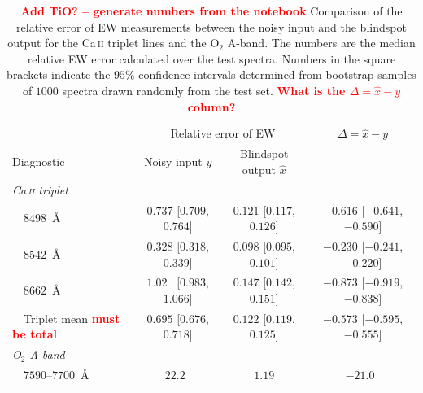 \documentclass[twocolumn]{aastex7}
\newcommand{\ld}[1]{\textcolor{red}{\textbf{#1}}}
\begin{document}
\begin{table}
\centering
    \begin{tabular}{lccc}
        \hline
          & \multicolumn{2}{c}{Relative error of EW} & $\Delta=\hat{x}-y$ \\
        Diagnostic & Noisy input $y$ & Blindspot output $\hat{x}$ \\
        \hline
        \multicolumn{4}{l}{\emph{Ca\,\textsc{ii} triplet}} \\
        $\quad 8498$~\AA   & $0.737$ [$0.709$, $0.764$] & $0.121$ [$0.117$, $0.126$] & $-0.616$ [$-0.641$, $-0.590$] \\
        $\quad 8542$~\AA   & $0.328$ [$0.318$, $0.339$] & $0.098$ [$0.095$, $0.101$] & $-0.230$ [$-0.241$, $-0.220$] \\
        $\quad 8662$~\AA   & $1.02\phantom{0}$ [$0.983$, $1.066$] & $0.147$ [$0.142$, $0.151$] & $-0.873$ [$-0.919$, $-0.838$] \\
        $\quad$Triplet mean \ld{must be total} & $0.695$ [$0.676$, $0.718$] & $0.122$ [$0.119$, $0.125$] & $-0.573$ [$-0.595$, $-0.555$] \\
        \hline
        \multicolumn{3}{l}{\emph{\mbox{O$_2$} A-band}} \\
        $\quad 7590$--$7700$~\AA{} & $22.2\phantom{0}$ & $1.19$ & $-21.0\phantom{0}$ \\
        \hline
\end{tabular}
\caption{
    \ld{Add TiO? -- generate numbers from the notebook}
    Comparison of the relative error of EW measurements between the noisy input and the blindspot output for the Ca\,\textsc{ii} triplet lines and the \mbox{O$_2$} A-band. The numbers are the median relative EW error calculated over the test spectra. Numbers in the square brackets indicate the $95\%$ confidence intervals determined from bootstrap samples of $1000$ spectra drawn randomly from the test set.
    \ld{What is the $\Delta=\hat{x}-y$ column?}
}
\label{tab:main_results}
\end{table}
\end{document}
